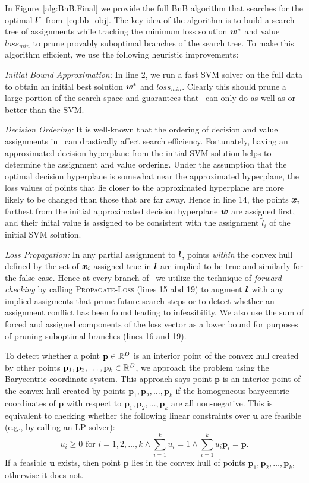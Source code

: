 In Figure~\ref{alg:BnB.Final} we provide the full BnB algorithm that
searches for the optimal $\boldsymbol{l}^*$ from~\eqref{eq:bb_obj}.  The key idea
of the algorithm is to build a search tree of assignments while
tracking the minimum loss solution $\boldsymbol{w}^*$ and value $loss_{min}$ to
prune provably suboptimal branches of the search tree.  To make this
algorithm efficient, we use the following heuristic improvements:

\noindent \emph{Initial Bound Approximation:} In line 2, we run a fast
SVM solver on the full data to obtain an initial best solution $\boldsymbol{w}^*$
and $loss_{min}$.  Clearly this should prune a large portion of the
search space and guarantees that \BB\ can only do as well as or better
than the SVM.

\noindent \emph{Decision Ordering:} It is well-known that the ordering
of decision and value assignments in \BB\ can drastically affect
search efficiency.  Fortunately, having an approximated decision
hyperplane from the initial SVM solution helps to determine the
assignment and value ordering. Under the assumption that the optimal
decision hyperplane is somewhat near the approximated hyperplane, the
loss values of points that lie closer to the approximated hyperplane
are more likely to be changed than those that are far away.  Hence in
line 14, the points $\boldsymbol{x}_i$ farthest from the initial approximated
decision hyperplane $\tilde{\boldsymbol{w}}$ are assigned first, and their inital
value is assigned to be consistent with the assignment $\tilde{l}_i$
of the initial SVM solution.

\noindent \emph{Loss Propagation:} In any partial assignment to $\boldsymbol{l}$,
points \emph{within} the convex hull defined by the set of $\boldsymbol{x}_i$
assigned true in $\boldsymbol{l}$ are implied to be true and similarly for the
false case.  Hence at every branch of \BB\ we utilize the technique of
\emph{forward checking} by calling \textsc{Propagate-Loss} (lines 15
abd 19) to augment $\boldsymbol{l}$ with any implied assigments that prune future
search steps or to detect whether an assignment conflict has been
found leading to infeasibility.  We also use the sum of forced and
assigned components of the loss vector as a lower bound for purposes
of pruning suboptimal branches (lines 16 and 19).

To detect whether a point $\mathbf{p} \in \mathbb{R}^D$ is an interior
point of the convex hull created by other points $\mathbf{p}_1,
  \mathbf{p}_2, \dots, \mathbf{p}_k \in \mathbb{R}^D$, we approach the problem using the
Barycentric coordinate system.  This approach says point
$\mathbf{p}$ is an interior point of the convex hull created by
points $\mathbf{p}_1, \mathbf{p}_2, \dots, \mathbf{p}_k$ if the homogeneous
barycentric coordinates of $\mathbf{p}$ with respect to
$\mathbf{p}_1, \mathbf{p}_2, \dots, \mathbf{p}_k$ are all non-negative. This is
equivalent to checking whether the following linear constraints
over $\mathbf{u}$ are feasible (e.g., by calling an LP solver):
$$
u_i \geq 0 \text{ for } i = 1,2, \dots, k \land \sum_{i=1}^k u_i = 1 \land \sum_{i=1}^k u_i \mathbf{p}_i = \mathbf{p}. 
$$ If a feasible $\mathbf{u}$ exists, then point $\mathbf{p}$
lies in the convex hull of points $\mathbf{p}_1, \mathbf{p}_2, \dots,
\mathbf{p}_k$, otherwise it does not.

